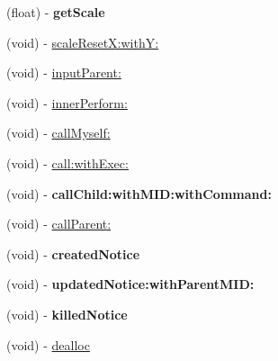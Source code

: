 \begin{DoxyCompactItemize}
\item 
\hypertarget{interface_messenger_view_controller_a97b35c6553c0ec2e6aae62ec4f4e8db4}{
(float) -\/ {\bfseries getScale}}
\label{interface_messenger_view_controller_a97b35c6553c0ec2e6aae62ec4f4e8db4}

\item 
(void) -\/ \hyperlink{interface_messenger_view_controller_a9a0f05d1d3a3685a3d3ce7632c2bc7ee}{scaleResetX:withY:}
\item 
(void) -\/ \hyperlink{interface_messenger_view_controller_a33bb3cca76fba84a3e5b480131e5faf1}{inputParent:}
\item 
(void) -\/ \hyperlink{interface_messenger_view_controller_a2c415df83e46605177105d75c714e463}{innerPerform:}
\item 
(void) -\/ \hyperlink{interface_messenger_view_controller_a416d9acd2e8346b9ab8870b64571f322}{callMyself:}
\item 
(void) -\/ \hyperlink{interface_messenger_view_controller_a7a416a5ec2bcd17f259e1b2fc017d6a6}{call:withExec:}
\item 
\hypertarget{interface_messenger_view_controller_a95e335be7444d6a9fd4631fa8a5f9f3e}{
(void) -\/ {\bfseries callChild:withMID:withCommand:}}
\label{interface_messenger_view_controller_a95e335be7444d6a9fd4631fa8a5f9f3e}

\item 
(void) -\/ \hyperlink{interface_messenger_view_controller_afa8cf33ccddb2f83e214b192707bdbd6}{callParent:}
\item 
\hypertarget{interface_messenger_view_controller_ae8415c3e0079cb51a8374a47efa0bbd2}{
(void) -\/ {\bfseries createdNotice}}
\label{interface_messenger_view_controller_ae8415c3e0079cb51a8374a47efa0bbd2}

\item 
\hypertarget{interface_messenger_view_controller_a975afc92bea2290fcae8b57ab85985d3}{
(void) -\/ {\bfseries updatedNotice:withParentMID:}}
\label{interface_messenger_view_controller_a975afc92bea2290fcae8b57ab85985d3}

\item 
\hypertarget{interface_messenger_view_controller_abf4d1e2b5e6cd851f60601482ec500ef}{
(void) -\/ {\bfseries killedNotice}}
\label{interface_messenger_view_controller_abf4d1e2b5e6cd851f60601482ec500ef}

\item 
(void) -\/ \hyperlink{interface_messenger_view_controller_a764894e696ddb4254c216dbb8d58b279}{dealloc}
\end{DoxyCompactItemize}
